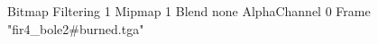 {Bitmap
	{Filtering 1}
	{Mipmap 1}
	{Blend none}
	{AlphaChannel 0}
	{Frame "fir4_bole2#burned.tga"}
}
